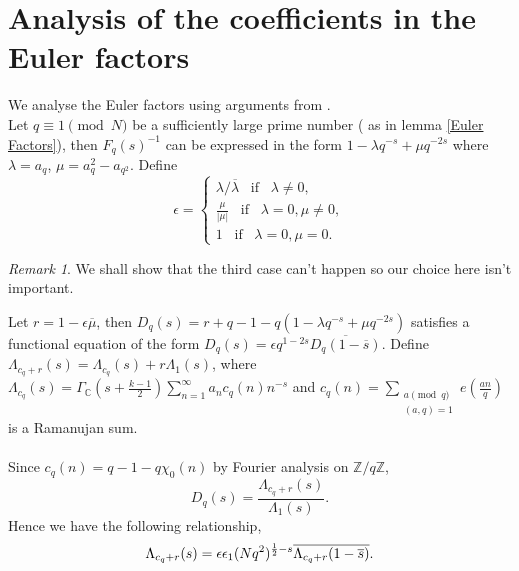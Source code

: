 \documentclass[a4paper,12.5pt]{amsart}
\theoremstyle{definition}
\theoremstyle{remark}
\newtheorem*{rem}{Remark}
\begin{document}
\section{Analysis of the coefficients in the Euler factors}
We analyse the Euler factors using arguments from \cite{Converse}. \\
Let $q \equiv 1 \pmod{N}$ be a sufficiently large prime number ( as in lemma \ref{Euler Factors}), then $F_q(s)^{-1}$ can be expressed in the form  $ 1 - \lambda q^{-s} + \mu q^{-2s}$ where $\lambda= a_q$, $\mu=  a_q^2-a_{q^2}$.
Define
\[      \epsilon = \begin{cases}  \lambda/ \overline{\lambda} \; \; \; \text{if} \; \; \; \lambda \neq 0 ,\\
\frac{\mu}{|\mu|} \;  \; \; \text{if}   \; \; \; \lambda=0  , \mu \neq 0  ,\\
1  \;  \; \; \text{if}   \; \; \;   \lambda =0, \mu =0  .
\end{cases}
\] 
\begin{rem}We shall show that the third case can't happen so our choice here isn't important.
\end{rem} 

Let $r=1- \epsilon \overline{\mu}$, then $D_q(s)= r+q -1 -q( 1-\lambda q^{-s}+ \mu q^{-2s})$ satisfies a functional equation of the form $D_q(s)= \epsilon q^{1-2s} \overline{D_q(1-\overline{s})}$. Define $\Lambda_{c_q+r} (s)= \Lambda_{c_q} (s)+ r \Lambda_1(s)$, where $ \Lambda_{c_q} (s)= \Gamma_{\mathbb{C}} (s+ \frac{k-1}{2} )  \sum_{n=1}^{\infty} a_n c_q(n) n^{-s}$ and $c_q(n) =\sum_{ \substack{ a \pmod q  \\ (a,q)=1       } } e(\frac{an}{q})   $ is a Ramanujan sum.  \\ \\
Since $c_q(n)=q-1-q \chi_0 (n)$ by Fourier analysis on $\mathbb{Z}/q\mathbb{Z}$, 
  \begin{equation*}
       D_q(s)= \frac{\Lambda_{c_q+r} (s)}{\Lambda_{1} (s)}.
  \end{equation*}
  Hence we have the following relationship,
  \begin{equation}{\label{Functional equation for c_q}}
      \Lambda_{c_q+r}(s) = \epsilon \epsilon _1  (Nq^2)^{\frac{1}{2}-s} \overline{ \Lambda_{c_q+r}(1- \overline{s})   }.
  \end{equation}
\end{document}
